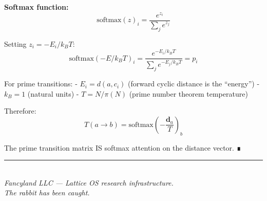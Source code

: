 \documentclass[
  11pt,
]{article}
\numberwithin{equation}{section}
\begin{document}
\textbf{Softmax function:}
\begin{equation}\text{softmax}(z)_i = \frac{e^{z_i}}{\sum_j e^{z_j}}\end{equation}

Setting \(z_i = -E_i / k_B T\):
\begin{equation}\text{softmax}(-E / k_B T)_i = \frac{e^{-E_i / k_B T}}{\sum_j e^{-E_j / k_B T}} = p_i\end{equation}

For prime transitions: - \(E_i = d(a, c_i)\) (forward cyclic distance is
the ``energy'') - \(k_B = 1\) (natural units) - \(T = N/\pi(N)\) (prime
number theorem temperature)

Therefore:
\begin{equation}T(a \to b) = \text{softmax}\left(-\frac{\mathbf{d}_a}{T}\right)_b\end{equation}

The prime transition matrix IS softmax attention on the distance vector.
∎



\bigskip
\begin{center}
\rule{0.4\linewidth}{0.4pt}\\[0.8em]
\emph{Fancyland LLC --- Lattice OS research infrastructure.}\\[0.3em]
\emph{The rabbit has been caught.}
\end{center}
\end{document}
